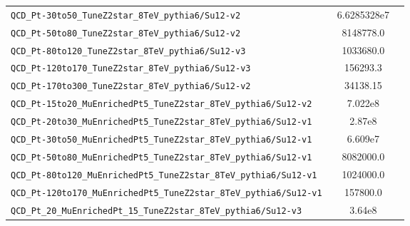 \begin{table}[H]
{\begin{minipage}{\textwidth}
\begin{tabular}{lcc}
{\tt QCD\_Pt-30to50\_TuneZ2star\_8TeV\_pythia6/Su12-v2                  }& 6.6285328e7       \\
{\tt QCD\_Pt-50to80\_TuneZ2star\_8TeV\_pythia6/Su12-v2                  }& 8148778.0         \\
{\tt QCD\_Pt-80to120\_TuneZ2star\_8TeV\_pythia6/Su12-v3                 }& 1033680.0         \\
{\tt QCD\_Pt-120to170\_TuneZ2star\_8TeV\_pythia6/Su12-v3                }& 156293.3          \\
{\tt QCD\_Pt-170to300\_TuneZ2star\_8TeV\_pythia6/Su12-v2                }& 34138.15          \\
{\tt QCD\_Pt-15to20\_MuEnrichedPt5\_TuneZ2star\_8TeV\_pythia6/Su12-v2   }& 7.022e8           \\
{\tt QCD\_Pt-20to30\_MuEnrichedPt5\_TuneZ2star\_8TeV\_pythia6/Su12-v1   }& 2.87e8            \\
{\tt QCD\_Pt-30to50\_MuEnrichedPt5\_TuneZ2star\_8TeV\_pythia6/Su12-v1   }& 6.609e7           \\
{\tt QCD\_Pt-50to80\_MuEnrichedPt5\_TuneZ2star\_8TeV\_pythia6/Su12-v1   }& 8082000.0         \\
{\tt QCD\_Pt-80to120\_MuEnrichedPt5\_TuneZ2star\_8TeV\_pythia6/Su12-v1  }& 1024000.0         \\
{\tt QCD\_Pt-120to170\_MuEnrichedPt5\_TuneZ2star\_8TeV\_pythia6/Su12-v1 }& 157800.0          \\
{\tt QCD\_Pt\_20\_MuEnrichedPt\_15\_TuneZ2star\_8TeV\_pythia6/Su12-v3   }& 3.64e8            \\
\hline\hline
\end{tabular}
\end{minipage}
}
\end{table}
